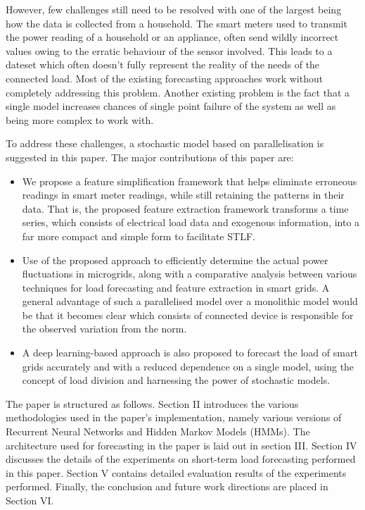 \documentclass[conference]{IEEEtran}
\begin{document}
However, few challenges still need to be resolved with one of the largest being how the data is collected from a household. The smart meters used to transmit the power reading of a household or an appliance, often send wildly incorrect values owing to the erratic behaviour of the sensor involved. This leads to a dateset which often doesn't fully represent the reality of the needs of the connected load. Most of the existing forecasting approaches work without completely addressing this problem. Another existing problem is the fact that a single model increases chances of single point failure of the system as well as being more complex to work with.

To address these challenges, a stochastic model based on parallelisation is suggested in this paper. The major contributions of this paper are:
\begin{itemize}
    \item We propose a feature simplification framework that helps eliminate erroneous readings in smart meter readings, while still retaining the patterns in their data. That is, the proposed feature extraction framework transforms a time series, which consists of electrical load data and exogenous information, into a far more compact and simple form to facilitate STLF.
    \item Use of the proposed approach to efficiently determine the actual power fluctuations in microgrids, along with a comparative analysis between various techniques for load forecasting and feature extraction in smart grids. A general advantage of such a parallelised model over a monolithic model would be that it becomes clear which consists of connected device is responsible for the observed variation from the norm. 
    \item A deep learning-based approach is also proposed to forecast the load of smart grids accurately and with a reduced dependence on a single model, using the concept of load division and harnessing the power of stochastic models.
\end{itemize}

The paper is structured as follows. Section II introduces the various methodologies used in the paper's implementation, namely various versions of Recurrent Neural Networks and Hidden Markov Models (HMMs). The architecture used for forecasting in the paper is laid out in section III. Section IV discusses the details of the experiments on short-term load forecasting performed in this paper. Section V contains detailed evaluation results of the experiments performed. Finally, the conclusion and future work directions are placed in Section VI.
\end{document}

